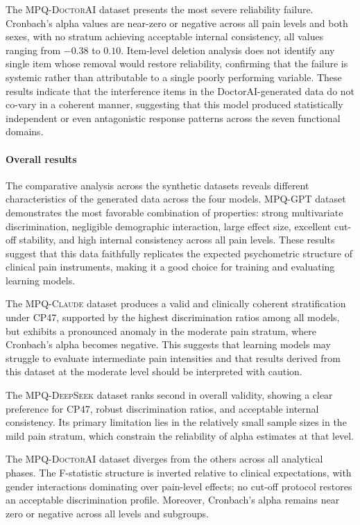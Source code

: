 \documentclass[preprint,12pt,authoryear]{elsarticle}
\newcommand{\dbGPT}{\small\textsc{MPQ-GPT}\xspace}
\newcommand{\dbClaude}{\small\textsc{MPQ-Claude}\xspace}
\newcommand{\dbDeepSeek}{\small\textsc{MPQ-DeepSeek}\xspace}
\newcommand{\dbDoctorAI}{\small\textsc{MPQ-DoctorAI}\xspace}
\begin{document}
The \dbDoctorAI dataset presents the most severe reliability failure. Cronbach's alpha values are near-zero or negative across all pain levels and both sexes, with no stratum achieving acceptable internal consistency, all values ranging from $-0.38$ to $0.10$. Item-level deletion analysis does not identify any single item whose removal would restore reliability, confirming that the failure is systemic rather than attributable to a single poorly performing variable. These results indicate that the interference items in the DoctorAI-generated data do not co-vary in a coherent manner, suggesting that this model produced statistically independent or even antagonistic response patterns across the seven functional domains.

\paragraph{Overall results} The comparative analysis across the synthetic datasets reveals different characteristics of the generated data across the four models.
\dbGPT dataset demonstrates the most favorable combination of properties: strong multivariate discrimination, negligible demographic interaction, large effect size, excellent cut-off stability, and high internal consistency across all pain levels. These results suggest that this data faithfully replicates the expected psychometric structure of clinical pain instruments, making it a good choice for training and evaluating learning models.

The \dbClaude dataset produces a valid and clinically coherent stratification under CP47, supported by the highest discrimination ratios among all models, but exhibits a pronounced anomaly in the moderate pain stratum, where Cronbach's alpha becomes negative. This suggests that learning models may struggle to evaluate intermediate pain intensities and that results derived from this dataset at the moderate level should be interpreted with caution.

The \dbDeepSeek dataset ranks second in overall validity, showing a clear preference for CP47, robust discrimination ratios, and acceptable internal consistency. Its primary limitation lies in the relatively small sample sizes in the mild pain stratum, which constrain the reliability of alpha estimates at that level.

The \dbDoctorAI dataset diverges from the others across all analytical phases. The F-statistic structure is inverted relative to clinical expectations, with gender interactions dominating over pain-level effects; no cut-off protocol restores an acceptable discrimination profile. Moreover, Cronbach's alpha remains near zero or negative across all levels and subgroups. %
\end{document}
